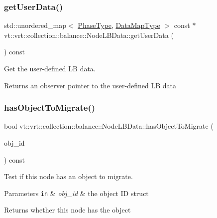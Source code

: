\subsubsection{\texorpdfstring{get\+User\+Data()}{getUserData()}}
{\footnotesize\ttfamily std\+::unordered\+\_\+map$<$ \hyperlink{namespacevt_a46ce6733d5cdbd735d561b7b4029f6d7}{Phase\+Type}, \hyperlink{namespacevt_1_1vrt_1_1collection_1_1balance_acf152c668ed9e2e9c6b29784181d2435}{Data\+Map\+Type} $>$ const  $\ast$ vt\+::vrt\+::collection\+::balance\+::\+Node\+L\+B\+Data\+::get\+User\+Data (\begin{DoxyParamCaption}{ }\end{DoxyParamCaption}) const}



Get the user-\/defined LB data. 

\begin{DoxyReturn}{Returns}
an observer pointer to the user-\/defined LB data 
\end{DoxyReturn}
\mbox{\label{structvt_1_1vrt_1_1collection_1_1balance_1_1_node_l_b_data_af025247a42d9b3ff6ba476714aad42fa}} 
\subsubsection{\texorpdfstring{has\+Object\+To\+Migrate()}{hasObjectToMigrate()}}
{\footnotesize\ttfamily bool vt\+::vrt\+::collection\+::balance\+::\+Node\+L\+B\+Data\+::has\+Object\+To\+Migrate (\begin{DoxyParamCaption}\item[{\hyperlink{namespacevt_1_1vrt_1_1collection_1_1balance_a9f5b53fafb270212279a4757d2c4cd28}{Element\+I\+D\+Struct}}]{obj\+\_\+id }\end{DoxyParamCaption}) const}



Test if this node has an object to migrate. 


\begin{DoxyParams}[1]{Parameters}
\mbox{\tt in}  & {\em obj\+\_\+id} & the object ID struct\\
\hline
\end{DoxyParams}
\begin{DoxyReturn}{Returns}
whether this node has the object 
\end{DoxyReturn}
\mbox{\label{structvt_1_1vrt_1_1collection_1_1balance_1_1_node_l_b_data_aa489e1252abac8237d30bb0110ad36f9}} 
